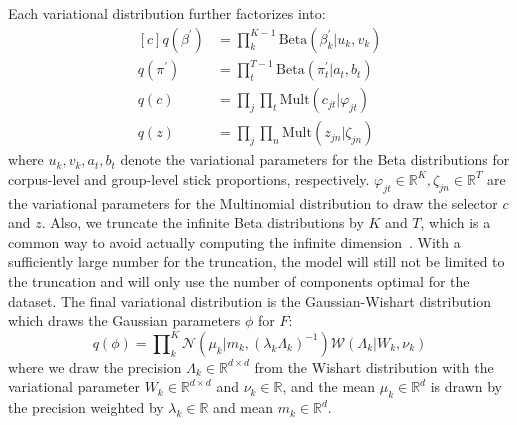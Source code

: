 \documentclass{article}
\begin{document}
Each variational distribution further factorizes into:
\begin{equation}\label{eq:meanfield_further}
\begin{aligned}[c]
    q(\beta^{\prime}) &= \textstyle \prod\nolimits_{k}^{K-1}\text{Beta}(\beta^{\prime}_{k}|u_{k}, v_{k}) \\
    q(\pi^{\prime}) &= \textstyle \prod\nolimits_{t}^{T-1}\text{Beta}(\pi^{\prime}_{t}|a_{t}, b_{t}) \\
    q(c) &= \textstyle \prod\nolimits_{j}\prod\nolimits_{t}\text{Mult}(c_{jt}|\varphi_{jt}) \\
    q(z) &= \textstyle \prod\nolimits_{j}\prod\nolimits_{n}\text{Mult}(z_{jn}|\zeta_{jn})
\end{aligned}
\end{equation}
where $u_{k}, v_{k}, a_{t}, b_{t}$ denote the variational parameters for the Beta distributions for corpus-level and group-level stick proportions, respectively. $\varphi_{jt}\in\mathbb{R}^{K}, \zeta_{jn}\in\mathbb{R}^{T}$ are the variational parameters for the Multinomial distribution to draw the selector $c$ and $z$. Also, we truncate the infinite Beta distributions by $K$ and $T$, which is a common way to avoid actually computing the infinite dimension~\cite{DBLP:journals/jmlr/WangPB11}. With a sufficiently large number for the truncation, the model will still not be limited to the truncation and will only use the number of components optimal for the dataset. The final variational distribution is the Gaussian-Wishart distribution which draws the Gaussian parameters $\phi$ for $F$:
\begin{equation}\label{eq:meanfield_normalwishart}
    q(\phi) = \textstyle \prod\nolimits_{k}^{K}\mathcal{N}(\mu_{k}|m_{k}, (\lambda_{k}\Lambda_{k})^{-1})\mathcal{W}(\Lambda_{k}|W_{k}, \nu_{k})
\end{equation}
where we draw the precision $\Lambda_{k}\in\mathbb{R}^{d \times d}$ from the Wishart distribution with the variational parameter $W_{k}\in\mathbb{R}^{d \times d}$ and $\nu_{k}\in\mathbb{R}$, and the mean $\mu_{k}\in\mathbb{R}^{d}$ is drawn by the precision weighted by $\lambda_{k}\in\mathbb{R}$ and mean $m_{k}\in\mathbb{R}^{d}$.
\end{document}
